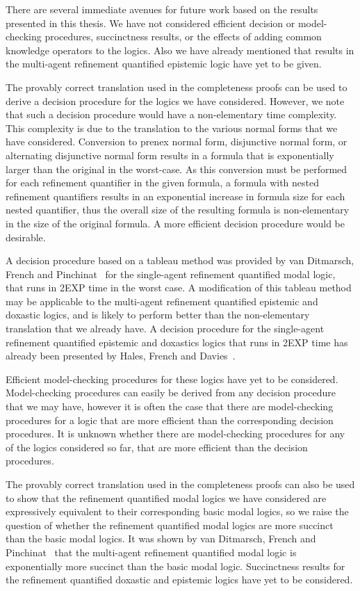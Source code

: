 There are several immediate avenues for future work based on the results
presented in this thesis. We have not considered efficient decision or
model-checking procedures, succinctness results, or the effects of adding common
knowledge operators to the logics. Also we have already mentioned that results
in the multi-agent refinement quantified epistemic logic have yet to be given.

The provably correct translation used in the completeness proofs can be used to
derive a decision procedure for the logics we have considered. However, we note
that such a decision procedure would have a non-elementary time complexity. This
complexity is due to the translation to the various normal forms that we have
considered. Conversion to prenex normal form, disjunctive normal form, or
alternating disjunctive normal form results in a formula that is exponentially
larger than the original in the worst-case. As this conversion must be performed
for each refinement quantifier in the given formula, a formula with nested
refinement quantifiers results in an exponential increase in formula size for each
nested quantifier, thus the overall size of the resulting formula is
non-elementary in the size of the original formula. A more efficient decision
procedure would be desirable.

A decision procedure based on a tableau method was provided by van Ditmarsch,
French and Pinchinat~\cite{french2010future} for the single-agent refinement
quantified modal logic, that runs in 2EXP time in the worst case. A modification
of this tableau method may be applicable to the multi-agent refinement
quantified epistemic and doxastic logics, and is likely to perform better than
the non-elementary translation that we already have. A decision procedure for
the single-agent refinement quantified epistemic and doxastics logics that
runs in 2EXP time has already been presented by Hales, French and
Davies~\cite{hales2011refinement}.

Efficient model-checking procedures for these logics have yet to be considered.
Model-checking procedures can easily be derived from any decision procedure that
we may have, however it is often the case that there are model-checking
procedures for a logic that are more efficient than the corresponding decision
procedures. It is unknown whether there are model-checking procedures for any of
the logics considered so far, that are more efficient than the decision
procedures.

The provably correct translation used in the completeness proofs can also be
used to show that the refinement quantified modal logics we have considered are
expressively equivalent to their corresponding basic modal logics, so we raise
the question of whether the refinement quantified modal logics are more succinct
than the basic modal logics. It was shown by van Ditmarsch, French and
Pinchinat~\cite{french2010future} that the multi-agent refinement quantified
modal logic is exponentially more succinct than the basic modal logic.
Succinctness results for the refinement quantified doxastic and epistemic logics
have yet to be considered.

